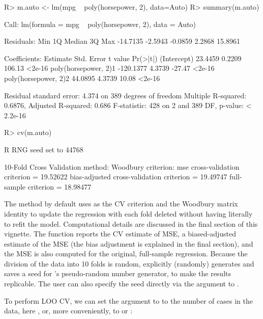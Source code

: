 \documentclass[
]{jss}
\begin{document}
\begin{CodeChunk}
\begin{CodeInput}
R> m.auto <- lm(mpg ~ poly(horsepower, 2), data=Auto)
R> summary(m.auto)
\end{CodeInput}
\begin{CodeOutput}

Call:
lm(formula = mpg ~ poly(horsepower, 2), data = Auto)

Residuals:
     Min       1Q   Median       3Q      Max 
-14.7135  -2.5943  -0.0859   2.2868  15.8961 

Coefficients:
                      Estimate Std. Error t value Pr(>|t|)
(Intercept)            23.4459     0.2209  106.13   <2e-16
poly(horsepower, 2)1 -120.1377     4.3739  -27.47   <2e-16
poly(horsepower, 2)2   44.0895     4.3739   10.08   <2e-16

Residual standard error: 4.374 on 389 degrees of freedom
Multiple R-squared:  0.6876,    Adjusted R-squared:  0.686 
F-statistic:   428 on 2 and 389 DF,  p-value: < 2.2e-16
\end{CodeOutput}
\begin{CodeInput}
R> cv(m.auto)
\end{CodeInput}
\begin{CodeOutput}
R RNG seed set to 44768
\end{CodeOutput}
\begin{CodeOutput}
10-Fold Cross Validation
method: Woodbury
criterion: mse
cross-validation criterion = 19.52622
bias-adjusted cross-validation criterion = 19.49747
full-sample criterion = 18.98477 
\end{CodeOutput}
\end{CodeChunk}

The  method by default uses  as the CV criterion
and the Woodbury matrix identity to update the regression with each fold
deleted without having literally to refit the model. Computational
details are discussed in the final section of this vignette. The
function reports the CV estimate of MSE, a biased-adjusted estimate of
the MSE (the bias adjustment is explained in the final section), and the
MSE is also computed for the original, full-sample regression. Because
the division of the data into 10 folds is random,  explicitly
(randomly) generates and saves a seed for 's pseudo-random
number generator, to make the results replicable. The user can also
specify the seed directly via the  argument to .

To perform LOO CV, we can set the  argument to  to
the number of cases in the data, here , or, more
conveniently, to  or :
\end{document}
